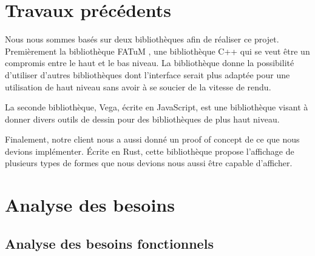 \documentclass[12pt]{article}
\begin{document}
\section{Travaux précédents}

Nous nous sommes basés sur deux bibliothèques afin de réaliser ce projet.
Premièrement la bibliothèque FATuM \cite{FATuM}, une bibliothèque C++ qui se veut être un compromis entre le haut et le bas niveau. La bibliothèque donne la possibilité d'utiliser d'autres bibliothèques dont l'interface serait plus adaptée pour une utilisation de haut niveau sans avoir à se soucier de la vitesse de rendu.

La seconde bibliothèque, Vega\cite{VegaMarks}, écrite en JavaScript, est une bibliothèque visant à donner divers outils de dessin pour des bibliothèques de plus haut niveau.

Finalement, notre client nous a aussi donné un proof of concept de ce que nous devions implémenter. Écrite en Rust, cette bibliothèque propose l'affichage de plusieurs types de formes que nous devions nous aussi être capable d'afficher.

\section{Analyse des besoins}

\subsection{Analyse des besoins fonctionnels}
\end{document}
